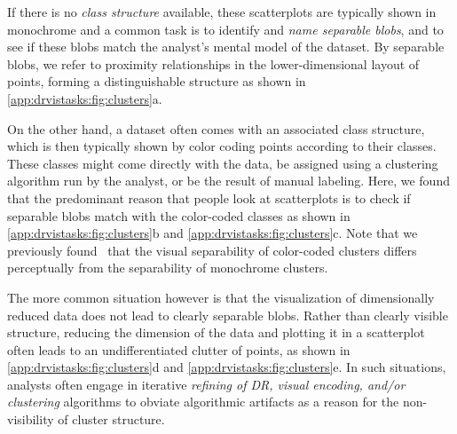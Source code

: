 If there is no {\it class structure} available, these scatterplots are typically shown in monochrome and a common task is to identify and {\it name separable blobs}, and to see if these blobs match the analyst's mental model of the dataset. 
By separable blobs, we refer to proximity relationships in the lower-dimensional layout of points, forming a distinguishable structure as shown in \autoref{app:drvistasks:fig:clusters}a.  

On the other hand, a dataset often comes with an associated class structure, which is then typically shown by color coding points according to their classes. 
These classes might come directly with the data, be assigned using a clustering algorithm run by the analyst, or be the result of manual labeling.   
Here, we found that the predominant reason that people look at scatterplots is to check if separable blobs match with the color-coded classes as shown in \autoref{app:drvistasks:fig:clusters}b and \autoref{app:drvistasks:fig:clusters}c. 
Note that we previously found~\cite{Sedlmair2012a} that the visual separability of color-coded clusters differs perceptually from the separability of monochrome clusters.

The more common situation however is that the visualization of dimensionally reduced data does not lead to clearly separable blobs. Rather than clearly visible structure, reducing the dimension of the data and plotting it in a scatterplot often leads to an undifferentiated clutter of points, as shown in \autoref{app:drvistasks:fig:clusters}d and \autoref{app:drvistasks:fig:clusters}e. 
In such situations, analysts often engage in iterative {\it refining of \ac{DR}, visual encoding, and/or clustering} algorithms to obviate algorithmic artifacts as a reason for the non-visibility of cluster structure. 



